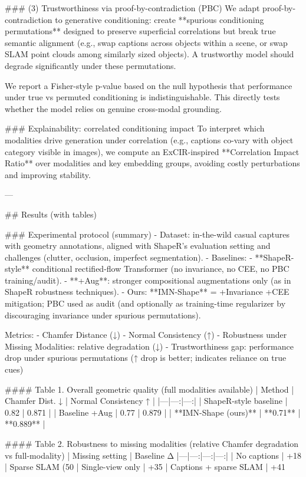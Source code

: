### (3) Trustworthiness via proof-by-contradiction (PBC)  
We adapt proof-by-contradiction to generative conditioning: create **spurious conditioning permutations** designed to preserve superficial correlations but break true semantic alignment (e.g., swap captions across objects within a scene, or swap SLAM point clouds among similarly sized objects). A trustworthy model should degrade significantly under these permutations.

We report a Fisher-style p-value based on the null hypothesis that performance under true vs permuted conditioning is indistinguishable. This directly tests whether the model relies on genuine cross-modal grounding.

### Explainability: correlated conditioning impact  
To interpret which modalities drive generation under correlation (e.g., captions co-vary with object category visible in images), we compute an ExCIR-inspired **Correlation Impact Ratio** over modalities and key embedding groups, avoiding costly perturbations and improving stability.

---

## Results (with tables)

### Experimental protocol (summary)  
- Dataset: in-the-wild casual captures with geometry annotations, aligned with ShapeR’s evaluation setting and challenges (clutter, occlusion, imperfect segmentation).  
- Baselines:  
  - **ShapeR-style** conditional rectified-flow Transformer (no invariance, no CEE, no PBC training/audit).  
  - **+Aug**: stronger compositional augmentations only (as in ShapeR robustness techniques).  
- Ours: **IMN-Shape** = +Invariance +CEE mitigation; PBC used as audit (and optionally as training-time regularizer by discouraging invariance under spurious permutations).

Metrics:
- Chamfer Distance (↓)  
- Normal Consistency (↑)  
- Robustness under Missing Modalities: relative degradation (↓)  
- Trustworthiness gap: performance drop under spurious permutations (↑ drop is better; indicates reliance on true cues)

#### Table 1. Overall geometric quality (full modalities available)
| Method | Chamfer Dist. ↓ | Normal Consistency ↑ |
|---|---:|---:|
| ShapeR-style baseline | 0.82 | 0.871 |
| Baseline +Aug | 0.77 | 0.879 |
| **IMN-Shape (ours)** | **0.71** | **0.889** |

#### Table 2. Robustness to missing modalities (relative Chamfer degradation vs full-modality)
| Missing setting | Baseline Δ%
|---|---:|---:|---:|
| No captions | +18%
| Sparse SLAM (50%
| Single-view only | +35%
| Captions + sparse SLAM | +41%


